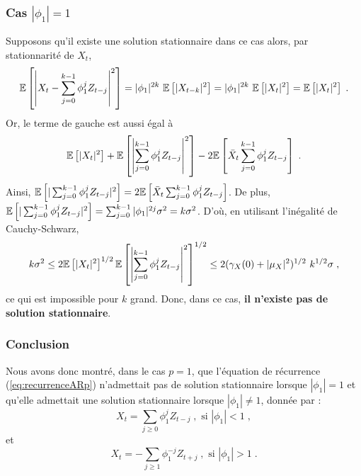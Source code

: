 \subsubsection{Cas $|\phi_1| = 1$}
Supposons qu'il existe une solution stationnaire dans ce cas alors,
par stationnarit\'e de $X_t$,
$$
\PE{\left|X_t - \sum_{j=0}^{k-1} \phi_1^j Z_{t-j}\right|^2} = |\phi_1|^{2k} \
\PE{|X_{t-k}|^2} = |\phi_1|^{2k}\ \PE{|X_{t}|^2}=\PE{|X_{t}|^2}\;.
$$
Or, le terme de gauche est aussi \'egal \`a
$$
{\mathbb E}\left[ |X_{t}|^2 \right] + {\mathbb E}\left[ \left|\sum_{j=0}^{k-1} \phi_1^j Z_{t-j}\right|^2 \right]
- 2 {\mathbb E}\left[ \bar{X}_{t} \sum_{j=0}^{k-1} \phi_1^j Z_{t-j} \right]\;.
$$
Ainsi, ${\mathbb E}\left[ |\sum_{j=0}^{k-1} \phi_1^j Z_{t-j}|^2 \right]
=2 {\mathbb E}\left[ \bar{X}_{t} \sum_{j=0}^{k-1} \phi_1^j Z_{t-j} \right]$.
De plus, ${\mathbb E}\left[ |\sum_{j=0}^{k-1} \phi_1^j Z_{t-j}|^2 \right] = \sum_{j=0}^{k-1}
|\phi_1|^{2j} \sigma^2 = k \sigma^2 $. D'o\`u, en utilisant
l'in\'egalit\'e de Cauchy-Schwarz,
$$
k\sigma^2 \leq 2 {\mathbb E}\left[ |X_t|^2 \right]^{1/2} {\mathbb E}\left[ \left|\sum_{j=0}^{k-1}
\phi_1^j Z_{t-j}\right|^2 \right]^{1/2} \leq 2 (\gamma_X(0)+|\mu_X|^2)^{1/2} \
k^{1/2} \sigma \;,
$$
ce qui est impossible pour $k$ grand.
Donc, dans ce cas, \textbf{il n'existe pas de solution stationnaire}.

\subsubsection{Conclusion}

Nous avons donc montr\'e, dans le cas $p=1$, que l'\'equation de  r\'ecurrence
(\ref{eq:recurrenceARp}) n'admettait pas de solution stationnaire
lorsque $|\phi_1|=1$ et qu'elle admettait une solution stationnaire
lorsque $|\phi_1|\neq 1$, donn\'ee par :
$$
X_t=\sum_{j\geq 0}\phi_1^j Z_{t-j}\;, \textrm{ si } |\phi_1|<1\;,
$$
et
$$
X_t=-\sum_{j\geq 1} \phi_1^{-j} Z_{t+j}\;, \textrm{ si } |\phi_1|>1\;.
$$

%
%


